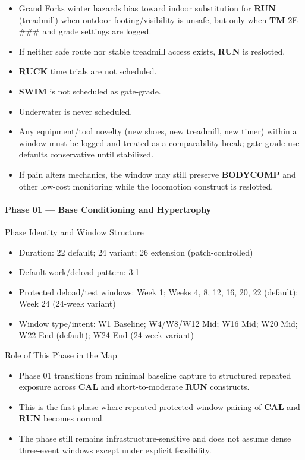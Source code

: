\documentclass[10pt]{article}
\begin{document}
\begin{itemize}
\item Grand Forks winter hazards bias toward indoor substitution for \textbf{RUN} (treadmill) when outdoor footing/visibility is unsafe, but only when \textbf{TM}-2E-### and grade settings are logged.
\item If neither safe route nor stable treadmill access exists, \textbf{RUN} is reslotted.
\item \textbf{RUCK} time trials are not scheduled.
\item \textbf{SWIM} is not scheduled as gate-grade.
\item Underwater is never scheduled.
\item Any equipment/tool novelty (new shoes, new treadmill, new timer) within a window must be logged and treated as a comparability break; gate-grade use defaults conservative until stabilized.
\item If pain alters mechanics, the window may still preserve \textbf{BODYCOMP} and other low-cost monitoring while the locomotion construct is reslotted.
\end{itemize}

\newpage
\paragraph*{Phase 01 — Base Conditioning and Hypertrophy}

Phase Identity and Window Structure

\begin{itemize}
\item Duration: 22 default; 24 variant; 26 extension (patch-controlled)
\item Default work/deload pattern: 3:1
\item Protected deload/test windows: Week 1; Weeks 4, 8, 12, 16, 20, 22 (default); Week 24 (24-week variant)
\item Window type/intent: W1 Baseline; W4/W8/W12 Mid; W16 Mid; W20 Mid; W22 End (default); W24 End (24-week variant)
\end{itemize}

Role of This Phase in the Map

\begin{itemize}
\item Phase 01 transitions from minimal baseline capture to structured repeated exposure across \textbf{CAL} and short-to-moderate \textbf{RUN} constructs.
\item This is the first phase where repeated protected-window pairing of \textbf{CAL} and \textbf{RUN} becomes normal.
\item The phase still remains infrastructure-sensitive and does not assume dense three-event windows except under explicit feasibility.
\end{itemize}
\end{document}

